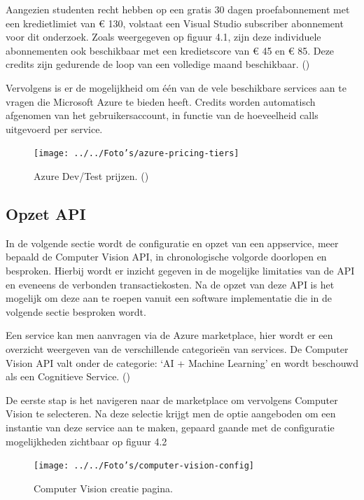 Aangezien studenten recht hebben op een gratis 30 dagen proefabonnement met een kredietlimiet van € 130, volstaat een Visual Studio subscriber abonnement voor dit onderzoek.  Zoals weergegeven op figuur 4.1, zijn deze individuele abonnementen ook beschikbaar met een kredietscore van € 45 en € 85. Deze credits zijn gedurende de loop van een volledige maand beschikbaar. (\cite{Microsoft2020f}) 



Vervolgens is er de mogelijkheid om één van de vele beschikbare services aan te vragen die Microsoft Azure te bieden heeft. Credits worden automatisch afgenomen van het gebruikersaccount, in functie van de hoeveelheid calls uitgevoerd per service.  
\begin{figure}
	\newpage
	
	\texttt{[image: ../../Foto's/azure-pricing-tiers]} 
	\captionsetup{justification=centering,margin=2cm}
	\caption{Azure Dev/Test prijzen. (\cite{Microsoft2020f})}
	\centering
\end{figure}

\subsection{Opzet API}
In de volgende sectie wordt de configuratie en opzet van een appservice, meer bepaald de Computer Vision API, in chronologische volgorde doorlopen en besproken. Hierbij wordt er inzicht gegeven in de mogelijke limitaties van de API en eveneens de verbonden transactiekosten. Na de opzet van deze API is het mogelijk om deze aan te roepen vanuit een software implementatie die in de volgende sectie besproken wordt. 


\newpage Een service kan men aanvragen via de Azure marketplace, hier wordt er een overzicht weergeven van de verschillende categorieën van services. De Computer Vision API valt onder de categorie: ‘AI + Machine Learning’ en wordt beschouwd als een Cognitieve Service. (\cite{Microsoft2020c}) 



De eerste stap is het navigeren naar de marketplace om vervolgens Computer Vision te selecteren. Na deze selectie krijgt men de optie aangeboden om een instantie van deze service aan te maken, gepaard gaande met de configuratie mogelijkheden zichtbaar op figuur 4.2   
\begin{figure}[h]
	
	\texttt{[image: ../../Foto's/computer-vision-config]}
	\captionsetup{justification=centering,margin=2cm}
	\caption{Computer Vision creatie pagina. }
	\centering
\end{figure}

